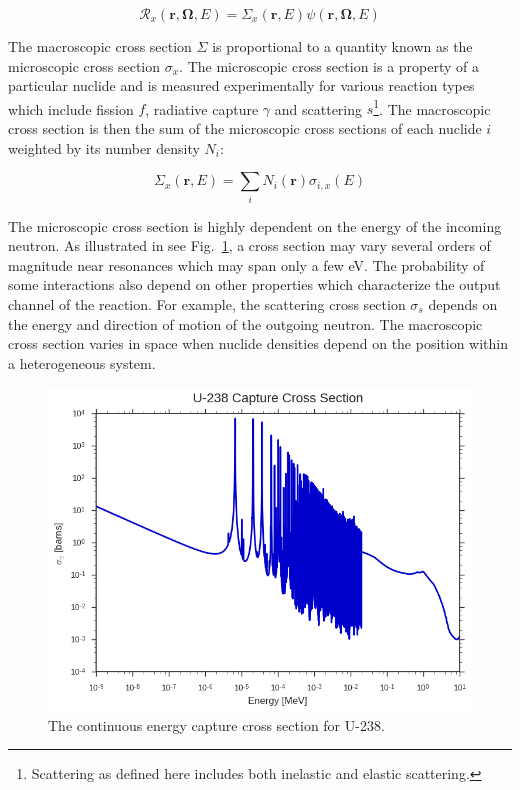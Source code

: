 \begin{dmath}
\label{eqn:chap2-rxn-rates}
\mathcal{R}_{x}(\mathbf{r},\mathbf{\Omega},E) = \Sigma_{x}(\mathbf{r},E) \psi(\mathbf{r},\mathbf{\Omega},E)
\end{dmath}

The macroscopic cross section $\Sigma$ is proportional to a quantity known as the microscopic cross section $\sigma_{x}$. The microscopic cross section is a property of a particular nuclide and is measured experimentally for various reaction types which include fission $f$, radiative capture $\gamma$ and scattering $s$\footnote{Scattering as defined here includes both inelastic and elastic scattering.}. The macroscopic cross section is then the sum of the microscopic cross sections of each nuclide $i$ weighted by its number density $N_{i}$:

\begin{dmath}
\label{eqn:chap2-macro-xs-sum}
\Sigma_{x}(\mathbf{r},E) = \sum_{i}N_{i}(\mathbf{r})\sigma_{i,x}(E)
\end{dmath}

The microscopic cross section is highly dependent on the energy of the incoming neutron. As illustrated in see Fig.~\ref{fig:chap2-u238-xs}, a cross section may vary several orders of magnitude near resonances which may span only a few eV. The probability of some interactions also depend on other properties which characterize the output channel of the reaction. For example, the scattering cross section $\sigma_{s}$ depends on the energy and direction of motion of the outgoing neutron. The macroscopic cross section varies in space when nuclide densities depend on the position within a heterogeneous system.

\begin{figure}[H]
  \centering
  \includegraphics[width=0.8\linewidth]{figures/mgxs/u238-capture-xs}
\caption[U-238 capture cross section]{The continuous energy capture cross section for U-238.}
\label{fig:chap2-u238-xs}
\end{figure}
 
